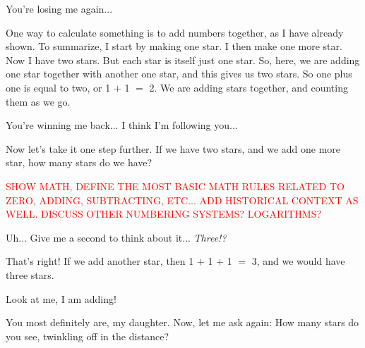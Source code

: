 \documentclass[main.tex]{subfiles}
\begin{document}

\par \Maia You're losing me again...

\par \Pleione One way to calculate something is to add numbers together, as I have already shown.  To summarize, I start by making one star.  I then make one more star.  Now I have two stars.  But each star is itself just one star.  So, here, we are adding one star together with another one star, and this gives us two stars.  So one plus one is equal to two, or 1 $+$ 1 $=$ 2.  We are adding stars together, and counting them as we go.

\par \Maia You're winning me back...  I think I'm following you...

\par \Pleione Now let's take it one step further.  If we have two stars, and we add one more star, how many stars do we have?

\begin{tcolorbox}[sharp corners, colback=red!30, colframe=red!80!blue, title=Mathematical Operations]
\par \textcolor{red} {SHOW MATH, DEFINE THE MOST BASIC MATH RULES RELATED TO ZERO, ADDING, SUBTRACTING, ETC...  ADD HISTORICAL CONTEXT AS WELL.  DISCUSS OTHER NUMBERING SYSTEMS?  LOGARITHMS? } 
\end{tcolorbox}
 
\par \Maia Uh... Give me a second to think about it... \textit{Three!?}

\par \Pleione That's right!  If we add another star, then 1 $+$ 1 $+$ 1 $=$ 3, and we would have three stars.  

\par \Maia Look at me, I am adding!

\par \Pleione You most definitely are, my daughter.  Now, let me ask again:  How many stars do you see, twinkling off in the distance?
\end{document}
